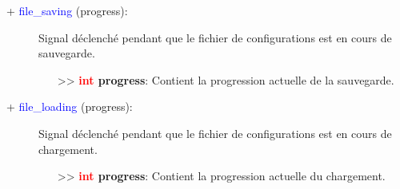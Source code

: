 \documentclass[a4paper, 11pt]{article}
\begin{document}
	\begin{description}
		\item [+ \textcolor{blue}{file\_saving} (progress):] Signal déclenché pendant que le fichier de
		configurations est en cours de sauvegarde.
		\begin{itemize}
			\item [>> \textbf{\textcolor{red}{int} progress}:] Contient la progression actuelle de la
			sauvegarde.\\
		\end{itemize}
	\end{description}
	\begin{description}
		\item [+ \textcolor{blue}{file\_loading} (progress):] Signal déclenché pendant que le fichier de
		configurations est en cours de chargement.
		\begin{itemize}
			\item [>> \textbf{\textcolor{red}{int} progress}:] Contient la progression actuelle du
			chargement.\\
		\end{itemize}
	\end{description}
\end{document}
